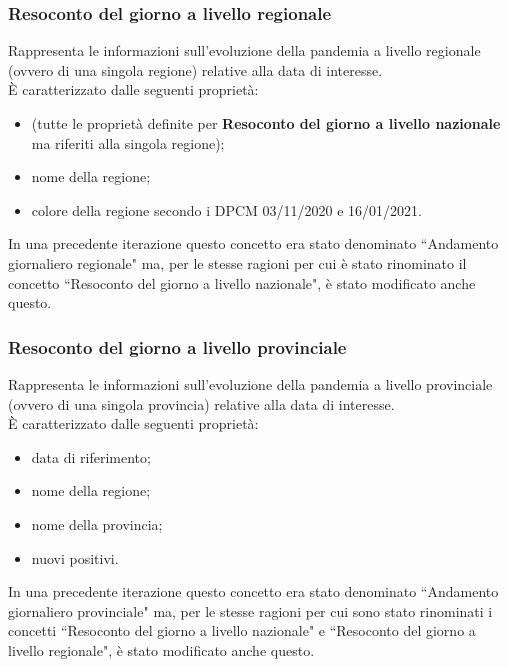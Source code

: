 \subsubsection{Resoconto del giorno a livello regionale}
\label{sss:resoconto-del-giorno-livello-regionale}
Rappresenta le informazioni sull'evoluzione della pandemia a livello regionale (ovvero di una singola regione) relative alla data di interesse.\\
È caratterizzato dalle seguenti proprietà:
\begin{itemize}
    \item (tutte le proprietà definite per \textbf{Resoconto del giorno a livello nazionale} ma riferiti alla singola regione);
    \item nome della regione;
    \item colore della regione secondo i DPCM 03/11/2020 e 16/01/2021.
\end{itemize}
In una precedente iterazione questo concetto era stato denominato ``Andamento giornaliero regionale" ma, per le stesse ragioni per cui è stato rinominato il concetto ``Resoconto del giorno a livello nazionale", è stato modificato anche questo.

\subsubsection{Resoconto del giorno a livello provinciale}
\label{sss:resoconto-del-giorno-livello-provinciale}
Rappresenta le informazioni sull'evoluzione della pandemia a livello provinciale (ovvero di una singola provincia) relative alla data di interesse.\\
È caratterizzato dalle seguenti proprietà:
\begin{itemize}
    \item data di riferimento;
    \item nome della regione;
    \item nome della provincia;
    \item nuovi positivi.
\end{itemize}
In una precedente iterazione questo concetto era stato denominato ``Andamento giornaliero provinciale" ma, per le stesse ragioni per cui sono stato rinominati i concetti ``Resoconto del giorno a livello nazionale" e ``Resoconto del giorno a livello regionale", è stato modificato anche questo.

